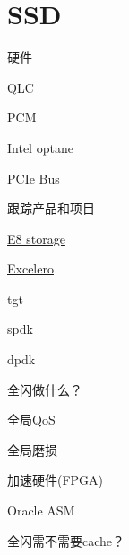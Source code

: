 \chapter{SSD}

硬件
\begin{enumbox}
\item *
\item QLC
\item PCM
\item Intel optane
\item PCIe Bus
\end{enumbox}

跟踪产品和项目
\begin{enumbox}
\item \href{https://e8storage.com/}{E8 storage}
\item \href{https://www.excelero.com/}{Excelero}
\item tgt
\item spdk
\item dpdk
\end{enumbox}

全闪做什么？
\begin{enumbox}
\item 全局QoS
\item 全局磨损
\item 加速硬件(FPGA)
\item Oracle ASM
\item 全闪需不需要cache？
\end{enumbox}
